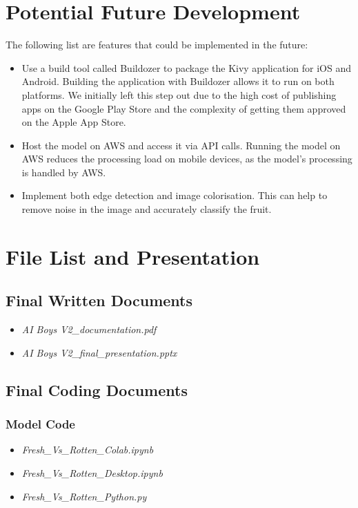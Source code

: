 \documentclass[conference]{IEEEtran}
\begin{document}
\section{Potential Future Development}

The following list are features that could be implemented in the future:
\begin{itemize}
    \item Use a build tool called Buildozer to package the Kivy application for iOS and Android. Building the application with Buildozer allows it to run on both platforms. We initially left this step out due to the high cost of publishing apps on the Google Play Store and the complexity of getting them approved on the Apple App Store.
    \item Host the model on AWS and access it via API calls. Running the model on AWS reduces the processing load on mobile devices, as the model's processing is handled by AWS.
    \item Implement both edge detection and image colorisation. This can help to remove noise in the image and accurately classify the fruit.
\end{itemize}

\section{File List and Presentation}

\subsection{Final Written Documents}
\begin{itemize}
    \item \textit{AI Boys V2\_documentation.pdf}
    \item \textit{AI Boys V2\_final\_presentation.pptx}
\end{itemize}

\subsection{Final Coding Documents}

\subsubsection{Model Code}
\begin{itemize}
    \item \textit{Fresh\_Vs\_Rotten\_Colab.ipynb}
    \item \textit{Fresh\_Vs\_Rotten\_Desktop.ipynb}
    \item \textit{Fresh\_Vs\_Rotten\_Python.py}
\end{itemize}
\end{document}
